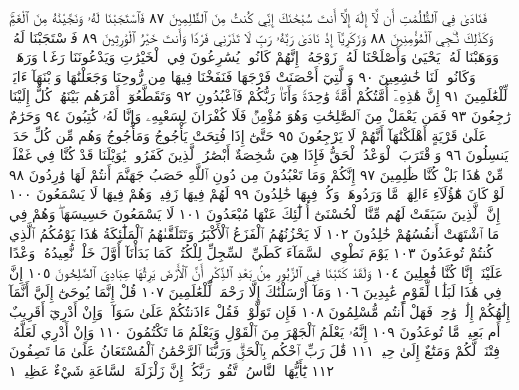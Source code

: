 فَنَادَىٰ فِي ٱلظُّلُمَٰتِ أَن لَّآ إِلَٰهَ إِلَّآ أَنتَ سُبْحَٰنَكَ إِنِّي
كُنتُ مِنَ ٱلظَّٰلِمِينَ ٨٧ فَٱسْتَجَبْنَا لَهُۥ وَنَجَّيْنَٰهُ
مِنَ ٱلْغَمِّۚ وَكَذَٰلِكَ نُـۨجِي ٱلْمُؤْمِنِينَ ٨٨ وَزَكَرِيَّآ
إِذْ نَادَىٰ رَبَّهُۥ رَبِّ لَا تَذَرْنِي فَرْدࣰا وَأَنتَ خَيْرُ ٱلْوَٰرِثِينَ ٨٩
فَٱسْتَجَبْنَا لَهُۥ وَوَهَبْنَا لَهُۥ يَحْيَىٰ وَأَصْلَحْنَا
لَهُۥ زَوْجَهُۥٓۚ إِنَّهُمْ كَانُوا۟ يُسَٰرِعُونَ فِي ٱلْخَيْرَٰتِ
وَيَدْعُونَنَا رَغَبࣰا وَرَهَبࣰاۖ وَكَانُوا۟ لَنَا خَٰشِعِينَ ٩٠
وَٱلَّتِيٓ أَحْصَنَتْ فَرْجَهَا فَنَفَخْنَا فِيهَا مِن رُّوحِنَا
وَجَعَلْنَٰهَا وَٱبْنَهَآ ءَايَةࣰ لِّلْعَٰلَمِينَ ٩١ إِنَّ هَٰذِهِۦٓ
أُمَّتُكُمْ أُمَّةࣰ وَٰحِدَةࣰ وَأَنَا۠ رَبُّكُمْ فَٱعْبُدُونِ ٩٢
وَتَقَطَّعُوٓا۟ أَمْرَهُم بَيْنَهُمْۖ كُلٌّ إِلَيْنَا رَٰجِعُونَ ٩٣
فَمَن يَعْمَلْ مِنَ ٱلصَّٰلِحَٰتِ وَهُوَ مُؤْمِنࣱ فَلَا كُفْرَانَ
لِسَعْيِهِۦ وَإِنَّا لَهُۥ كَٰتِبُونَ ٩٤ وَحَرَٰمٌ عَلَىٰ قَرْيَةٍ
أَهْلَكْنَٰهَآ أَنَّهُمْ لَا يَرْجِعُونَ ٩٥ حَتَّىٰٓ إِذَا فُتِحَتْ
يَأْجُوجُ وَمَأْجُوجُ وَهُم مِّن كُلِّ حَدَبࣲ يَنسِلُونَ ٩٦
وَٱقْتَرَبَ ٱلْوَعْدُ ٱلْحَقُّ فَإِذَا هِيَ شَٰخِصَةٌ أَبْصَٰرُ ٱلَّذِينَ
كَفَرُوا۟ يَٰوَيْلَنَا قَدْ كُنَّا فِي غَفْلَةࣲ مِّنْ هَٰذَا بَلْ كُنَّا
ظَٰلِمِينَ ٩٧ إِنَّكُمْ وَمَا تَعْبُدُونَ مِن دُونِ ٱللَّهِ
حَصَبُ جَهَنَّمَ أَنتُمْ لَهَا وَٰرِدُونَ ٩٨ لَوْ كَانَ
هَٰٓؤُلَآءِ ءَالِهَةࣰ مَّا وَرَدُوهَاۖ وَكُلࣱّ فِيهَا خَٰلِدُونَ ٩٩
لَهُمْ فِيهَا زَفِيرࣱ وَهُمْ فِيهَا لَا يَسْمَعُونَ ١٠٠ إِنَّ ٱلَّذِينَ
سَبَقَتْ لَهُم مِّنَّا ٱلْحُسْنَىٰٓ أُو۟لَٰٓئِكَ عَنْهَا مُبْعَدُونَ ١٠١
لَا يَسْمَعُونَ حَسِيسَهَاۖ وَهُمْ فِي مَا ٱشْتَهَتْ أَنفُسُهُمْ
خَٰلِدُونَ ١٠٢ لَا يَحْزُنُهُمُ ٱلْفَزَعُ ٱلْأَكْبَرُ وَتَتَلَقَّىٰهُمُ
ٱلْمَلَٰٓئِكَةُ هَٰذَا يَوْمُكُمُ ٱلَّذِي كُنتُمْ تُوعَدُونَ ١٠٣
يَوْمَ نَطْوِي ٱلسَّمَآءَ كَطَيِّ ٱلسِّجِلِّ لِلْكُتُبِۚ كَمَا
بَدَأْنَآ أَوَّلَ خَلْقࣲ نُّعِيدُهُۥۚ وَعْدًا عَلَيْنَآۚ إِنَّا كُنَّا
فَٰعِلِينَ ١٠٤ وَلَقَدْ كَتَبْنَا فِي ٱلزَّبُورِ مِنۢ بَعْدِ
ٱلذِّكْرِ أَنَّ ٱلْأَرْضَ يَرِثُهَا عِبَادِيَ ٱلصَّٰلِحُونَ ١٠٥
إِنَّ فِي هَٰذَا لَبَلَٰغࣰا لِّقَوْمٍ عَٰبِدِينَ ١٠٦ وَمَآ أَرْسَلْنَٰكَ
إِلَّا رَحْمَةࣰ لِّلْعَٰلَمِينَ ١٠٧ قُلْ إِنَّمَا يُوحَىٰٓ إِلَيَّ أَنَّمَآ
إِلَٰهُكُمْ إِلَٰهࣱ وَٰحِدࣱۖ فَهَلْ أَنتُم مُّسْلِمُونَ ١٠٨
فَإِن تَوَلَّوْا۟ فَقُلْ ءَاذَنتُكُمْ عَلَىٰ سَوَآءࣲۖ وَإِنْ أَدْرِيٓ أَقَرِيبٌ
أَم بَعِيدࣱ مَّا تُوعَدُونَ ١٠٩ إِنَّهُۥ يَعْلَمُ ٱلْجَهْرَ مِنَ
ٱلْقَوْلِ وَيَعْلَمُ مَا تَكْتُمُونَ ١١٠ وَإِنْ أَدْرِي لَعَلَّهُۥ
فِتْنَةࣱ لَّكُمْ وَمَتَٰعٌ إِلَىٰ حِينࣲ ١١١ قَٰلَ رَبِّ ٱحْكُم
بِٱلْحَقِّۗ وَرَبُّنَا ٱلرَّحْمَٰنُ ٱلْمُسْتَعَانُ عَلَىٰ مَا تَصِفُونَ ١١٢
يَٰٓأَيُّهَا ٱلنَّاسُ ٱتَّقُوا۟ رَبَّكُمْۚ إِنَّ زَلْزَلَةَ ٱلسَّاعَةِ شَيْءٌ عَظِيمࣱ ١
